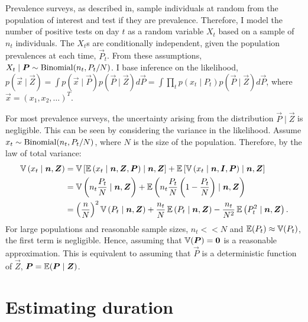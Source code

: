 \documentclass[thesis.tex]{subfiles}
\begin{document}
Prevalence surveys, as described in, sample individuals at random from the population of interest and test if they are prevalence.
Therefore, I model the number of positive tests on day $t$ as a random variable $X_t$ based on a sample of $n_t$ individuals.
The $X_t$s are conditionally independent, given the population prevalences at each time, $\vec{P}_t$. 
From these assumptions, $X_t \mid \bm{P} \sim \operatorname{Binomial}(n_t, P_t / N)$.
I base inference on the likelihood, $p(\vec{x} \mid \vec{Z}) = \int p(\vec{x} \mid \vec{P}) p(\vec{P} \mid \vec{Z}) d\vec{P} = \int \prod_t p(x_t \mid P_t) p(\vec{P} \mid \vec{Z}) d\vec{P}$, where $\vec{x} = (x_1, x_2, \dots)^T$.

For most prevalence surveys, the uncertainty arising from the distribution $\vec{P} \mid \vec{Z}$ is negligible.
This can be seen by considering the variance in the likelihood.
Assume $x_t \sim \operatorname{Binomial}(n_t, P_t / N)$, where $N$ is the size of the population.
Therefore, by the law of total variance:
\begin{align}
  \operatorname{\mathbb{V}}\left( x_t \mid \bm{n}, \bm{Z} \right)
    &= \operatorname{\mathbb{V}}\left[\operatorname{\mathbb{E}}\left( x_t \mid \bm{n}, \bm{Z}, \bm{P} \right) \mid \bm{n}, \bm{Z} \right] + \operatorname{\mathbb{E}}\left[\operatorname{\mathbb{V}}\left( x_t \mid \bm{n}, \bm{I}, \bm{P} \right) \mid \bm{n}, \bm{Z} \right] \\
    &= \operatorname{\mathbb{V}}\left( n_t \frac{P_t}{N} \mid \bm{n}, \bm{Z} \right) + \operatorname{\mathbb{E}}\left( n_t \frac{P_t}{N} \left(1 - \frac{P_t}{N} \right) \mid \bm{n}, \bm{Z} \right) \\
    &= \left( \frac{n}{N} \right)^2 \operatorname{\mathbb{V}}\left(P_t \mid \bm{n}, \bm{Z} \right) + \frac{n_t}{N} \operatorname{\mathbb{E}}\left(P_t \mid \bm{n}, \bm{Z} \right)  - \frac{n_t}{N^2} \operatorname{\mathbb{E}}\left(P_t^2 \mid \bm{n}, \bm{Z} \right).
\end{align}
For large populations and reasonable sample sizes, $n_t << N$ and $\operatorname{\mathbb{E}}(P_t) \approx \operatorname{\mathbb{V}}(P_t)$, the first term is negligible.
Hence, assuming that $\operatorname{\mathbb{V}}(\bm{P}) = \bm{0}$ is a reasonable approximation.
This is equivalent to assuming that $\vec{P}$ is a deterministic function of $\vec{Z}$, $\bm{P} = \operatorname{\mathbb{E}}( \bm{P} \mid \bm{Z})$.


\section{Estimating duration} \label{incidence-prevalence:sec:duration}
\end{document}

